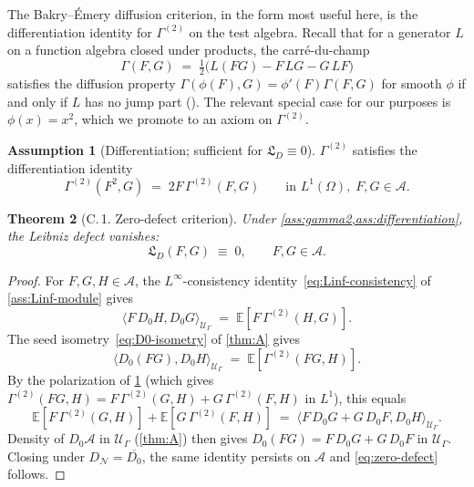 \documentclass[11pt,reqno]{amsart}
\theoremstyle{plain}
\newtheorem{theorem}{Theorem}[section]
\theoremstyle{definition}
\newtheorem{assumption}[theorem]{Assumption}
\theoremstyle{remark}
\newcommand{\E}{\mathbb{E}}
\newcommand{\cA}{\mathcal A}
\newcommand{\cN}{\mathcal N}
\newcommand{\cU}{\mathcal U}
\newcommand{\dN}{D_{\cN}}
\newcommand{\Lleib}{\mathfrak L}
\begin{document}
The Bakry--\'Emery diffusion criterion, in the form most useful
here, is the differentiation identity for $\Gamma^{(2)}$ on the
test algebra. Recall that for a generator $L$ on a function
algebra closed under products, the carr\'e-du-champ
\begin{equation}\label{eq:carre-du-champ-recall}
  \Gamma(F,G)\;=\;\tfrac{1}{2}\bigl(L(FG)-F\,LG-G\,LF\bigr)
\end{equation}
satisfies the diffusion property
$\Gamma(\phi(F),G)=\phi'(F)\Gamma(F,G)$ for smooth $\phi$ if and
only if $L$ has no jump part (\cite[Def.~1.11.1]{BakryGentilLedoux}).
The relevant special case for our purposes is $\phi(x)=x^{2}$,
which we promote to an axiom on $\Gamma^{(2)}$.

\begin{assumption}[Differentiation; sufficient for $\Lleib_{D}\equiv 0$]\label{ass:differentiation}
$\Gamma^{(2)}$ satisfies the differentiation identity
\begin{equation}\label{eq:differentiation}
  \Gamma^{(2)}(F^{2},G)\;=\;2F\,\Gamma^{(2)}(F,G)
  \qquad\text{in }L^{1}(\Omega),\;F,G\in\cA.
\end{equation}
\end{assumption}

\begin{theorem}[C.\,1. Zero-defect criterion]\label{thm:C-zero}
Under \cref{ass:gamma2,ass:differentiation}, the Leibniz
defect vanishes:
\begin{equation}\label{eq:zero-defect}
  \Lleib_{D}(F,G)\;\equiv\;0,\qquad F,G\in\cA.
\end{equation}
\end{theorem}

\begin{proof}
For $F,G,H\in\cA$, the $L^{\infty}$-consistency
identity~\eqref{eq:Linf-consistency} of
\cref{ass:Linf-module} gives
\[
  \langle F\,D_{0}H,D_{0}G\rangle_{\cU_{\Gamma}}
  \;=\;\E[F\,\Gamma^{(2)}(H,G)].
\]
The seed isometry~\eqref{eq:D0-isometry} of \cref{thm:A} gives
\[
  \langle D_{0}(FG),D_{0}H\rangle_{\cU_{\Gamma}}
  \;=\;\E[\Gamma^{(2)}(FG,H)].
\]
By the polarization of \cref{ass:differentiation} (which gives
$\Gamma^{(2)}(FG,H)=F\,\Gamma^{(2)}(G,H)+G\,\Gamma^{(2)}(F,H)$ in
$L^{1}$), this equals
\[
  \E[F\,\Gamma^{(2)}(G,H)]+\E[G\,\Gamma^{(2)}(F,H)]
  \;=\;\langle F\,D_{0}G+G\,D_{0}F,D_{0}H\rangle_{\cU_{\Gamma}}.
\]
Density of $D_{0}\cA$ in $\cU_{\Gamma}$ (\cref{thm:A}) then gives
$D_{0}(FG)=F\,D_{0}G+G\,D_{0}F$ in $\cU_{\Gamma}$. Closing under
$\dN=\overline{D_{0}}$, the same identity persists on $\cA$ and
\eqref{eq:zero-defect} follows.
\end{proof}
\end{document}
